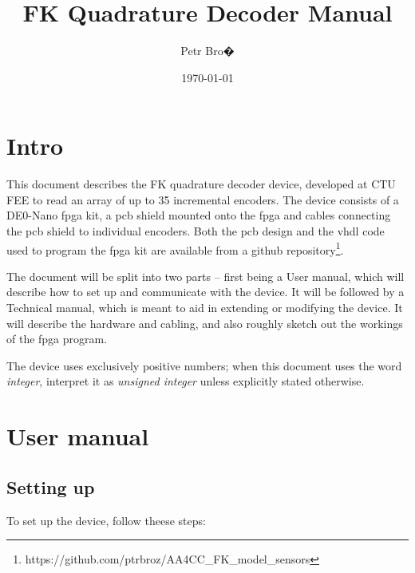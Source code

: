 \documentclass[twoside]{article}
\title{FK Quadrature Decoder Manual}
\author{Petr Bro�}
\date{\today}
\begin{document}
\maketitle

\tableofcontents

\newpage


\section{Intro}

This document describes the FK quadrature decoder device, developed at CTU FEE to read an array of up to 35 incremental encoders. The device consists of a DE0-Nano fpga kit, a pcb shield mounted onto the fpga and cables connecting the pcb shield to individual encoders. Both the pcb design and the vhdl code used to program the fpga kit are available from a github repository\footnote{https://github.com/ptrbroz/AA4CC\_FK\_model\_sensors}. 

The document will be split into two parts -- first being a User manual, which will describe how to set up and communicate with the device. It will be followed by a Technical manual, which is meant to aid in extending or modifying the device. It will describe the hardware and cabling, and also roughly sketch out the workings of the fpga program. 

The device uses exclusively positive numbers; when this document uses the word \emph{integer}, interpret it as \emph{unsigned integer} unless explicitly stated otherwise.

\section{User manual}

\subsection{Setting up}

To set up the device, follow theese steps:
\end{document}
